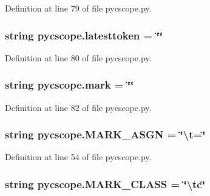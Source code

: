Definition at line 79 of file pycscope.\-py.

\hypertarget{namespacepycscope_ad0f7bbe25c20ebd6bcc1056a3d05287b}{
\subsubsection[{latesttoken}]{\setlength{\rightskip}{0pt plus 5cm}string pycscope.\-latesttoken = \char`\"{}\char`\"{}}}\label{namespacepycscope_ad0f7bbe25c20ebd6bcc1056a3d05287b}


Definition at line 80 of file pycscope.\-py.

\hypertarget{namespacepycscope_a912cfb92b6b00c96029f596ac9117aab}{
\subsubsection[{mark}]{\setlength{\rightskip}{0pt plus 5cm}string pycscope.\-mark = \char`\"{}\char`\"{}}}\label{namespacepycscope_a912cfb92b6b00c96029f596ac9117aab}


Definition at line 82 of file pycscope.\-py.

\hypertarget{namespacepycscope_ab29d723a3a1078980f5d06450f679c3f}{
\subsubsection[{M\-A\-R\-K\-\_\-\-A\-S\-G\-N}]{\setlength{\rightskip}{0pt plus 5cm}string pycscope.\-M\-A\-R\-K\-\_\-\-A\-S\-G\-N = \char`\"{}\textbackslash{}t=\char`\"{}}}\label{namespacepycscope_ab29d723a3a1078980f5d06450f679c3f}


Definition at line 54 of file pycscope.\-py.

\hypertarget{namespacepycscope_a400d0aef5f4e5a6c4573c4951a12eba3}{
\subsubsection[{M\-A\-R\-K\-\_\-\-C\-L\-A\-S\-S}]{\setlength{\rightskip}{0pt plus 5cm}string pycscope.\-M\-A\-R\-K\-\_\-\-C\-L\-A\-S\-S = \char`\"{}\textbackslash{}tc\char`\"{}}}\label{namespacepycscope_a400d0aef5f4e5a6c4573c4951a12eba3}


